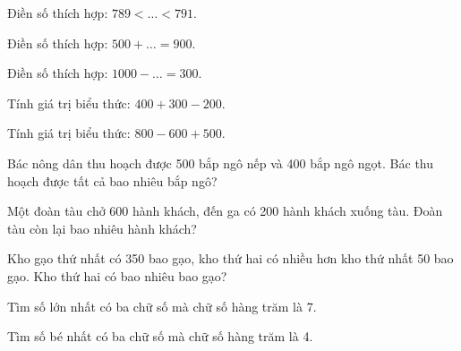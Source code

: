 \begin{ex}
Điền số thích hợp: $789 < \dots < 791$.
\end{ex}

\begin{ex}
Điền số thích hợp: $500 + \dots = 900$.
\end{ex}

\begin{ex}
Điền số thích hợp: $1000 - \dots = 300$.
\end{ex}

\begin{ex}
Tính giá trị biểu thức: $400 + 300 - 200$.
\end{ex}

\begin{ex}
Tính giá trị biểu thức: $800 - 600 + 500$.
\end{ex}

\begin{ex}
Bác nông dân thu hoạch được 500 bắp ngô nếp và 400 bắp ngô ngọt. Bác thu hoạch được tất cả bao nhiêu bắp ngô?
\end{ex}

\begin{ex}
Một đoàn tàu chở 600 hành khách, đến ga có 200 hành khách xuống tàu. Đoàn tàu còn lại bao nhiêu hành khách?
\end{ex}

\begin{ex}
Kho gạo thứ nhất có 350 bao gạo, kho thứ hai có nhiều hơn kho thứ nhất 50 bao gạo. Kho thứ hai có bao nhiêu bao gạo?
\end{ex}

\begin{ex}
Tìm số lớn nhất có ba chữ số mà chữ số hàng trăm là 7.
\end{ex}

\begin{ex}
Tìm số bé nhất có ba chữ số mà chữ số hàng trăm là 4.
\end{ex}

